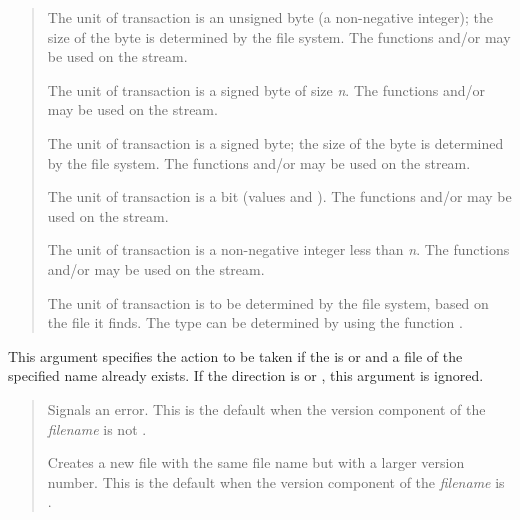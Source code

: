 \begin{defun}[Function]
\begin{flushdesc}
\begin{quotation}
\begin{flushdesc}
\item[\cdf{unsigned-byte}]
The unit of transaction is an unsigned byte (a non-negative integer);
the size of the byte is determined by the file system.
The functions  and/or  may be
used on the stream.

\item[\cd{(signed-byte \emph{n})}]
The unit of transaction is a signed byte of size \emph{n}.
The functions  and/or  may be
used on the stream.

\item[\cdf{signed-byte}]
The unit of transaction is a signed byte;
the size of the byte is determined by the file system.
The functions  and/or  may be
used on the stream.

\item[\cdf{bit}]
The unit of transaction is a bit (values  and ).
The functions  and/or  may be
used on the stream.

\item[\cd{(mod \emph{n})}]
The unit of transaction is a non-negative integer less than \emph{n}.
The functions  and/or  may be
used on the stream.

\item[\cd{:default}]
The unit of transaction is to be determined by the file system, based
on the file it finds.
The type can be determined by using the function .
\end{flushdesc}
\end{quotation}

\item[\cd{:if-exists}]
This argument specifies the action to be taken if the  is
 or  and a file of the specified name already exists.
If the direction is  or , this argument is ignored.
\begin{quotation}
\begin{flushdesc}
\item[\cd{:error}]
Signals an error.  This is the default when the version component of
the \emph{filename} is not .

\item[\cd{:new-version}]
Creates a new file with the same file name but with a larger version number.
This is the default when the version component of the \emph{filename} is .


\end{flushdesc}
\end{quotation}
\end{flushdesc}
\end{defun}
